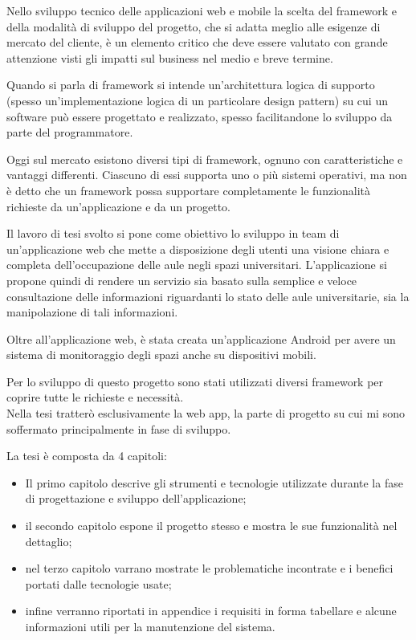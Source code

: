 Nello sviluppo tecnico delle applicazioni web e mobile la scelta del framework e della modalità di sviluppo del progetto, che si adatta meglio alle esigenze di mercato del cliente, è un elemento critico che deve essere valutato con grande attenzione visti gli impatti sul business nel medio e breve termine.

Quando si parla di framework si intende un'architettura logica di supporto (spesso un'implementazione logica di un particolare design pattern) su cui un software può essere progettato e realizzato, spesso facilitandone lo sviluppo da parte del programmatore.

Oggi sul mercato esistono diversi tipi di framework, ognuno con caratteristiche e vantaggi differenti. Ciascuno di essi supporta uno o più sistemi operativi, ma non è detto che un framework possa supportare completamente le funzionalità richieste da un’applicazione e da un progetto.

Il lavoro di tesi svolto si pone come obiettivo lo sviluppo in team di un'applicazione web che mette a disposizione degli utenti una visione chiara e completa dell'occupazione delle aule negli spazi universitari. L'applicazione si propone quindi di rendere un servizio sia basato sulla semplice e veloce consultazione delle informazioni riguardanti lo stato delle aule universitarie, sia la manipolazione di tali informazioni.

Oltre all'applicazione web, è stata creata un'applicazione Android per avere un sistema di monitoraggio degli spazi anche su dispositivi mobili.

Per lo sviluppo di questo progetto sono stati utilizzati diversi framework per coprire tutte le richieste e necessità.\\ Nella tesi tratterò esclusivamente la web app, la parte di progetto su cui mi sono soffermato principalmente in fase di sviluppo.

La tesi è composta da 4 capitoli:
\begin{itemize}
\item Il primo capitolo descrive gli strumenti e tecnologie utilizzate durante la fase di progettazione e sviluppo dell'applicazione;
\item il secondo capitolo espone il progetto stesso e mostra le sue funzionalità nel dettaglio;
\item nel terzo capitolo varrano mostrate le problematiche incontrate e i benefici portati dalle tecnologie usate;
\item infine verranno riportati in appendice i requisiti in forma tabellare e alcune informazioni utili per la manutenzione del sistema.
\end{itemize}